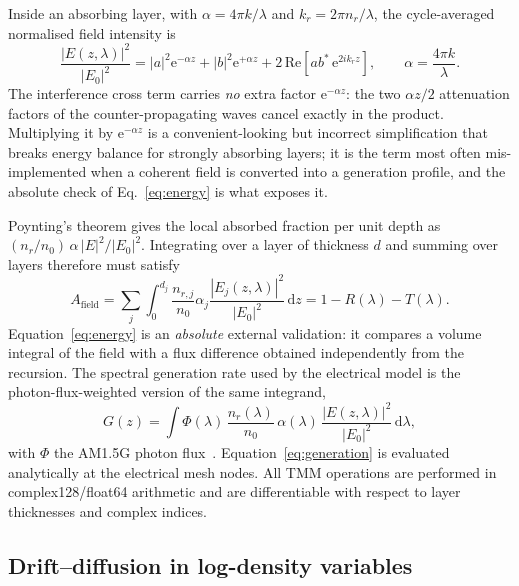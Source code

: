 \documentclass[preprint,12pt]{elsarticle}
\newcommand{\dd}{\mathrm{d}}
\newcommand{\ee}{\mathrm{e}}
\begin{document}
Inside an absorbing layer, with $\alpha=4\pi k/\lambda$ and
$k_r=2\pi n_r/\lambda$, the cycle-averaged normalised field intensity is
\begin{equation}
  \frac{|E(z,\lambda)|^2}{|E_0|^2}
  = |a|^2\ee^{-\alpha z} + |b|^2\ee^{+\alpha z}
  + 2\,\mathrm{Re}\!\left[a b^{*}\,\ee^{2 i k_r z}\right],
  \qquad \alpha = \frac{4\pi k}{\lambda}.
  \label{eq:I2}
\end{equation}
The interference cross term carries \emph{no} extra factor $\ee^{-\alpha z}$:
the two $\alpha z/2$ attenuation factors of the counter-propagating waves
cancel exactly in the product. Multiplying it by $\ee^{-\alpha z}$ is a
convenient-looking but incorrect simplification that breaks energy balance
for strongly absorbing layers; it is the term most often mis-implemented
when a coherent field is converted into a generation profile, and the
absolute check of Eq.~\eqref{eq:energy} is what exposes it.

Poynting's theorem gives the local absorbed fraction per unit depth as
$(n_r/n_0)\,\alpha\,|E|^2/|E_0|^2$. Integrating over a layer of thickness
$d$ and summing over layers therefore must satisfy
\begin{equation}
  A_{\mathrm{field}}
  = \sum_j \int_0^{d_j}\frac{n_{r,j}}{n_0}\alpha_j
    \frac{|E_j(z,\lambda)|^2}{|E_0|^2}\,\dd z
  = 1 - R(\lambda) - T(\lambda).
  \label{eq:energy}
\end{equation}
Equation~\eqref{eq:energy} is an \emph{absolute} external validation: it
compares a volume integral of the field with a flux difference obtained
independently from the recursion. The spectral generation rate used by the
electrical model is the photon-flux-weighted version of the same integrand,
\begin{equation}
  G(z) = \int \Phi(\lambda)\,\frac{n_r(\lambda)}{n_0}\,
         \alpha(\lambda)\,
         \frac{|E(z,\lambda)|^2}{|E_0|^2}\,\dd\lambda ,
  \label{eq:generation}
\end{equation}
with $\Phi$ the AM1.5G photon flux~\cite{astm2020}. Equation~\eqref{eq:generation} is evaluated analytically at the
electrical mesh nodes. All TMM operations are performed in
complex128/float64 arithmetic and are differentiable with respect to
layer thicknesses and complex indices.

\subsection{Drift--diffusion in log-density variables}
\label{sec:dd}
\end{document}
